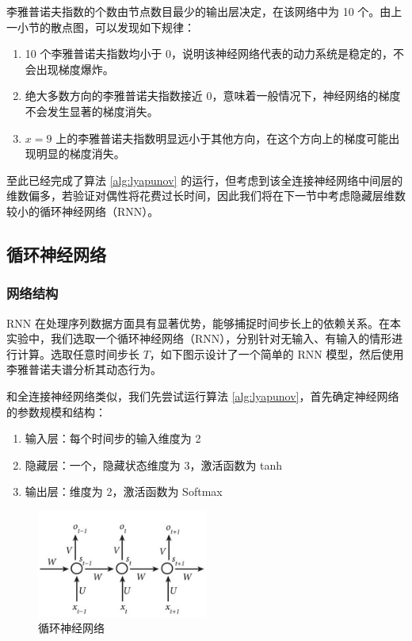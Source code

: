 李雅普诺夫指数的个数由节点数目最少的输出层决定，在该网络中为 10 个。由上一小节的散点图，可以发现如下规律：

\begin{enumerate}
  \item 10 个李雅普诺夫指数均小于 0，说明该神经网络代表的动力系统是稳定的，不会出现梯度爆炸。
  \item 绝大多数方向的李雅普诺夫指数接近 0，意味着一般情况下，神经网络的梯度不会发生显著的梯度消失。
  \item $x=9$ 上的李雅普诺夫指数明显远小于其他方向，在这个方向上的梯度可能出现明显的梯度消失。
\end{enumerate}

至此已经完成了算法 \ref{alg:lyapunov} 的运行，但考虑到该全连接神经网络中间层的维数偏多，若验证对偶性将花费过长时间，因此我们将在下一节中考虑隐藏层维数较小的循环神经网络（RNN）。

\clearpage

\subsection{循环神经网络}\label{sec:rnn}

\subsubsection{网络结构}

RNN 在处理序列数据方面具有显著优势，能够捕捉时间步长上的依赖关系。在本实验中，我们选取一个循环神经网络（RNN），分别针对无输入、有输入的情形进行计算。选取任意时间步长 $T$，如下图示设计了一个简单的 RNN 模型，然后使用李雅普诺夫谱分析其动态行为。

和全连接神经网络类似，我们先尝试运行算法 \ref{alg:lyapunov}，首先确定神经网络的参数规模和结构：

\begin{enumerate}
  \item 输入层：每个时间步的输入维度为 2
  \item 隐藏层：一个，隐藏状态维度为 3，激活函数为 tanh
  \item 输出层：维度为 2，激活函数为 Softmax
\end{enumerate}

\begin{figure}[htbp]
  \centering
  \includegraphics[width=0.5\textwidth]{figures/rnn.jpeg}
  \caption{循环神经网络}
  \label{fig:example}
\end{figure}

